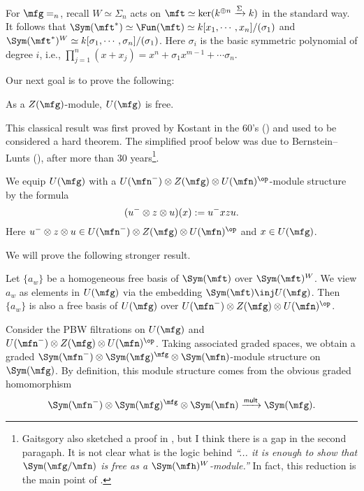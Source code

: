 	\begin{exam}
		\label{exam-sln-Chevalley}
		For $\mfg = \sl_n$, recall $W\simeq \Sigma_n$ acts on $\mft \simeq \ker( k^{\oplus n} \xrightarrow{\Sigma} k )$ in the standard way. It follows that $\Sym(\mft^*) \simeq \Fun(\mft) \simeq k[x_1,\cdots,x_n]/(\sigma_1)$ and $\Sym(\mft^*)^W \simeq k[\sigma_1,\cdots,\sigma_n]/(\sigma_1)$. Here $\sigma_i$ is the basic symmetric polynomial of degree $i$, i.e., $\prod_{j=1}^n (x+x_j) = x^n + \sigma_1 x^{m-1} + \cdots \sigma_n$.
	\end{exam}

	Our next goal is to prove the following:

	\begin{thm}[Kostant]
		As a $Z(\mfg)$-module, $U(\mfg)$ is free.
	\end{thm}

	\begin{rem}
		This classical result was first proved by Kostant in the 60's (\!\!\cite{K}) and used to be considered a hard theorem. The simplified proof below was due to Bernstein--Lunts (\!\!\cite{BL}), after more than 30 years\footnote{Gaitsgory also sketched a proof in \cite[Cor. 7.3]{G}, but I think there is a gap in the second paragaph. It is not clear what is the logic behind \emph{``... it is enough to show that $\Sym(\mfg/\mfn)$ is free as a $\Sym(\mfh)^W$-module.''} In fact, this reduction is the main point of \cite{BL}.}.
	\end{rem}

	\begin{constr}
		We equip $U(\mfg)$ with a $U(\mfn^-)\ot Z(\mfg)\ot U(\mfn)^{\op}$-module structure by the formula
		\[
			(u^-\ot z\ot u)(x):= u^- x z u.
		\]
		Here $u^-\ot z\ot u \in U(\mfn^-)\ot Z(\mfg)\ot U(\mfn)^{\op}$ and $x\in U(\mfg)$.
	\end{constr}

	We will prove the following stronger result.

	\begin{thm}
		\label{thm-Kostant-stronger}
		Let $\{a_w\}$ be a homogeneous free basis of $\Sym(\mft)$ over $\Sym(\mft)^W$. We view $a_w$ as elements in $U(\mfg)$ via the embedding $\Sym(\mft) \inj U(\mfg)$. Then $\{a_w\}$ is also a free basis of $U(\mfg)$ over $U(\mfn^-)\ot Z(\mfg)\ot U(\mfn)^{\op}$. 
	\end{thm}

	\begin{constr}
		Consider the PBW filtrations on $U(\mfg)$ and $U(\mfn^-)\ot Z(\mfg)\ot U(\mfn)^{\op}$. Taking associated graded spaces, we obtain a graded $\Sym(\mfn^-) \ot \Sym(\mfg)^\mfg \ot \Sym(\mfn)$-module structure on $\Sym(\mfg)$. By definition, this module structure comes from the obvious graded homomorphism
		\begin{equation}
			\label{eqn1}
			\Sym(\mfn^-) \ot \Sym(\mfg)^\mfg \ot \Sym(\mfn) \xrightarrow{\mathsf{mult}} \Sym(\mfg).
		\end{equation}
	\end{constr}

